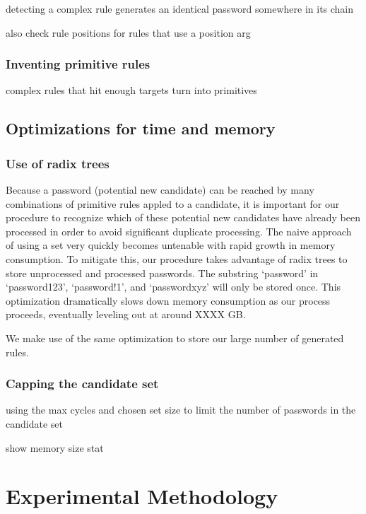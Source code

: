 \documentclass[letterpaper,twocolumn,10pt]{article}
\begin{document}
detecting a complex rule generates an identical password somewhere in its chain

also check rule positions for rules that use a position arg

\subsubsection{Inventing primitive rules}

complex rules that hit enough targets turn into primitives

\subsection{Optimizations for time and memory}

\subsubsection{Use of radix trees}

Because a password (potential new candidate) can be reached by many combinations of
primitive rules appled to a candidate, it is important for our procedure to recognize which
of these potential new candidates have already been processed in order to avoid significant
duplicate processing. The naive approach of using a set very quickly becomes untenable with
rapid growth in memory consumption. To mitigate this, our procedure takes advantage of radix trees
to store unprocessed and processed passwords. The substring `password' in 
`password123', `password!1', and `passwordxyz' will only be stored once. This optimization
dramatically slows down memory consumption as our process proceeds, eventually leveling out
at around XXXX GB.

We make use of the same optimization to store our large number of generated rules.

\subsubsection{Capping the candidate set}

using the max cycles and chosen set size to limit the number of passwords in
the candidate set

show memory size stat

\section{Experimental Methodology}
\end{document}
